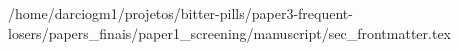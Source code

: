 /home/darciogm1/projetos/bitter-pills/paper3-frequent-losers/papers_finais/paper1_screening/manuscript/sec_frontmatter.tex